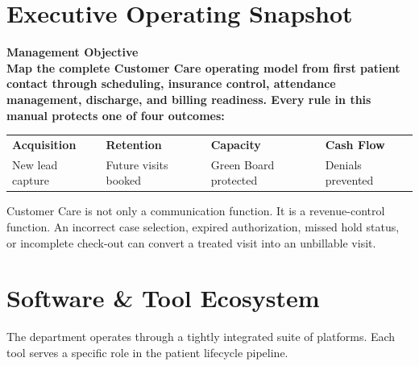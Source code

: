 \documentclass[11pt,a4paper]{article}
\begin{document}
\section*{Executive Operating Snapshot}

\begin{tcolorbox}[statbox]
\begin{center}
  \Large\bfseries\color{PrimaryBlue}Management Objective\\[0.4em]
  \normalsize
  Map the complete Customer Care operating model from first patient contact through
  scheduling, insurance control, attendance management, discharge, and billing readiness.
  Every rule in this manual protects one of four outcomes:
\end{center}

\vspace{0.3em}
\begin{center}
\begin{tabularx}{0.96\linewidth}{C{3.1cm} C{3.1cm} C{3.1cm} C{3.1cm}}
  \textcolor{PrimaryBlue}{\bfseries Acquisition} &
  \textcolor{AccentTeal}{\bfseries Retention} &
  \textcolor{AccentGold}{\bfseries Capacity} &
  \textcolor{DangerRed}{\bfseries Cash Flow} \\
  New lead capture &
  Future visits booked &
  Green Board protected &
  Denials prevented \\
\end{tabularx}
\end{center}
\end{tcolorbox}

\begin{tcolorbox}[rulebox,title={Operating Principle}]
Customer Care is not only a communication function. It is a revenue-control function.
An incorrect case selection, expired authorization, missed hold status, or incomplete
check-out can convert a treated visit into an unbillable visit.
\end{tcolorbox}


\section{Software \& Tool Ecosystem}

The department operates through a tightly integrated suite of platforms.
Each tool serves a specific role in the patient lifecycle pipeline.
\end{document}
